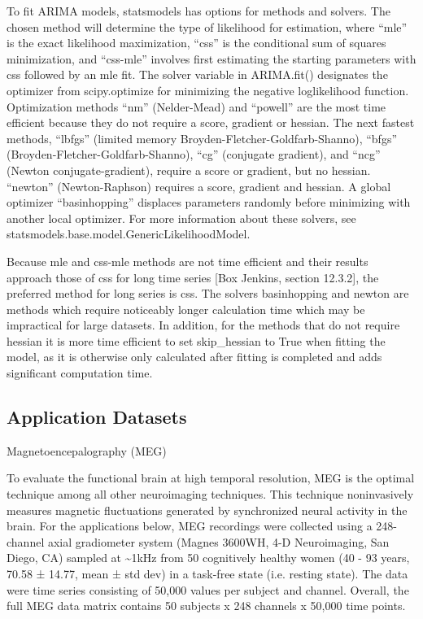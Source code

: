 \documentclass[letterpaper,compsoc,twoside]{IEEEtran}
\begin{document}
To fit ARIMA models, statsmodels has options for methods and solvers. The chosen method will determine the type of likelihood for estimation, where “mle” is the exact likelihood maximization, “css” is the conditional sum of squares minimization, and “css-mle” involves first estimating the starting parameters with css followed by an mle fit. The solver variable in ARIMA.fit()  designates the optimizer from scipy.optimize for minimizing the negative loglikelihood function. Optimization methods “nm” (Nelder-Mead)  and “powell” are the most time efficient because they do not require a score, gradient or hessian. The next fastest methods, “lbfgs” (limited memory Broyden-Fletcher-Goldfarb-Shanno), “bfgs” (Broyden-Fletcher-Goldfarb-Shanno), “cg” (conjugate gradient), and “ncg” (Newton conjugate-gradient), require a score or gradient, but no hessian. “newton” (Newton-Raphson) requires a score, gradient and hessian. A global optimizer “basinhopping” displaces parameters randomly before minimizing  with another local optimizer.  For more information about these solvers, see statsmodels.base.model.GenericLikelihoodModel.

Because mle and css-mle methods are not time efficient and their results approach those of css for long time series {[}Box Jenkins, section 12.3.2{]}, the preferred method for long series is css. The solvers basinhopping and newton are methods which require noticeably longer calculation time which may be impractical for large datasets. In addition, for the methods that do not require hessian it is more time efficient  to set skip\_hessian to True when fitting the model, as it is otherwise only calculated after fitting is completed and adds significant computation time.

\subsection{Application Datasets%
  \label{application-datasets}%
}


Magnetoencepalography (MEG)

To evaluate the functional brain at high temporal resolution, MEG is the optimal technique among all other neuroimaging techniques. This technique noninvasively measures magnetic fluctuations generated by synchronized neural activity in the brain. For the applications below, MEG recordings were collected using a 248-channel axial gradiometer system (Magnes 3600WH, 4-D Neuroimaging, San Diego, CA) sampled at \textasciitilde{}1kHz from 50 cognitively healthy women (40 - 93 years, 70.58 ± 14.77, mean ± std dev) in a task-free state (i.e. resting state). The data were time series consisting of 50,000 values per subject and channel. Overall, the full MEG data matrix contains 50 subjects x 248 channels x 50,000 time points.
\end{document}
